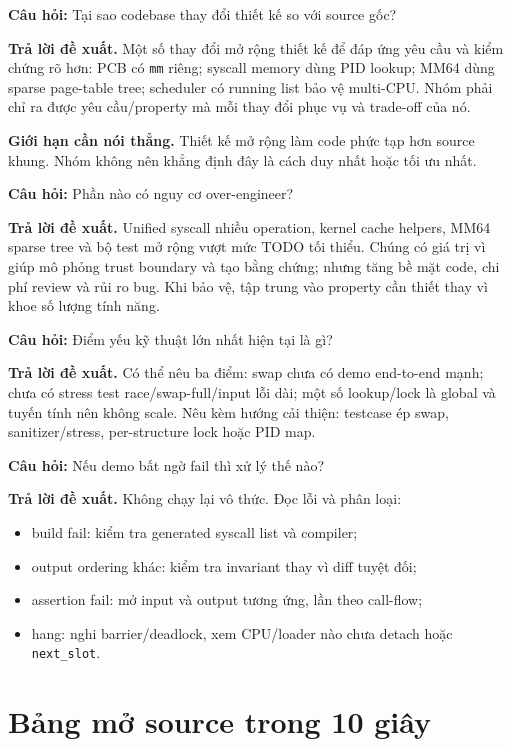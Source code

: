 \documentclass[11pt,a4paper]{article}
\newcommand{\code}[1]{\texttt{\color{navy}#1}}
\newcommand{\q}[1]{%
  \vspace{0.55em}\noindent
  \colorbox{pale}{\parbox{\dimexpr\textwidth-2\fboxsep}{\textbf{\color{navy}Câu hỏi:} #1}}%
  \par\vspace{0.3em}}
\newcommand{\ans}[1]{\textbf{\color{cyan}Trả lời đề xuất.} #1\par}
\newcommand{\limitanswer}[1]{\textbf{\color{red}Giới hạn cần nói thẳng.} #1\par}
\begin{document}
\q{Tại sao codebase thay đổi thiết kế so với source gốc?}
\ans{Một số thay đổi mở rộng thiết kế để đáp ứng yêu cầu và kiểm chứng rõ hơn:
PCB có \code{mm} riêng; syscall memory dùng PID lookup; MM64 dùng sparse
page-table tree; scheduler có running list bảo vệ multi-CPU. Nhóm phải chỉ ra
được yêu cầu/property mà mỗi thay đổi phục vụ và trade-off của nó.}
\limitanswer{Thiết kế mở rộng làm code phức tạp hơn source khung. Nhóm không nên
khẳng định đây là cách duy nhất hoặc tối ưu nhất.}

\q{Phần nào có nguy cơ over-engineer?}
\ans{Unified syscall nhiều operation, kernel cache helpers, MM64 sparse tree và
bộ test mở rộng vượt mức TODO tối thiểu. Chúng có giá trị vì giúp mô phỏng
trust boundary và tạo bằng chứng; nhưng tăng bề mặt code, chi phí review và rủi
ro bug. Khi bảo vệ, tập trung vào property cần thiết thay vì khoe số lượng tính
năng.}

\q{Điểm yếu kỹ thuật lớn nhất hiện tại là gì?}
\ans{Có thể nêu ba điểm: swap chưa có demo end-to-end mạnh; chưa có stress test
race/swap-full/input lỗi dài; một số lookup/lock là global và tuyến tính nên
không scale. Nêu kèm hướng cải thiện: testcase ép swap, sanitizer/stress,
per-structure lock hoặc PID map.}

\q{Nếu demo bất ngờ fail thì xử lý thế nào?}
\ans{Không chạy lại vô thức. Đọc lỗi và phân loại:
\begin{itemize}
  \item build fail: kiểm tra generated syscall list và compiler;
  \item output ordering khác: kiểm tra invariant thay vì diff tuyệt đối;
  \item assertion fail: mở input và output tương ứng, lần theo call-flow;
  \item hang: nghi barrier/deadlock, xem CPU/loader nào chưa detach hoặc
  \code{next\_slot}.
\end{itemize}}

\section{Bảng mở source trong 10 giây}
\end{document}
